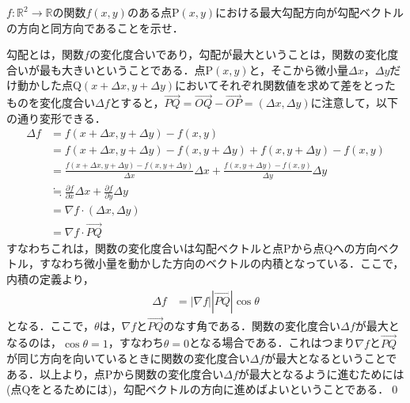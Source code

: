 \begin{qu}
$f:\mathbb{R}^2 \to \mathbb{R}$の関数$f(x,y)$のある点P$(x,y)$における最大勾配方向が勾配ベクトルの方向と同方向であることを示せ．
\end{qu}
\begin{ans}
勾配とは，関数$f$の変化度合いであり，勾配が最大ということは，関数の変化度合いが最も大きいということである．点P$(x,y)$と，そこから微小量$\Delta x$，$\Delta y$だけ動かした点Q$(x+\Delta x,y+\Delta y)$においてそれぞれ関数値を求めて差をとったものを変化度合い$\Delta f$とすると，$\overrightarrow{PQ}=\overrightarrow{OQ}-\overrightarrow{OP}=(\Delta x,\Delta y)$に注意して，以下の通り変形できる．
\begin{align*}
\Delta f &= f(x+\Delta x,y+\Delta y)-f(x,y) \\
&= f(x+\Delta x,y+\Delta y) -f(x,y+\Delta y)+f(x,y+\Delta y) -f(x,y) \\
&= \frac{f(x+\Delta x,y+\Delta y) -f(x,y+\Delta y)}{\Delta x}\Delta x +\frac{f(x,y+\Delta y) -f(x,y)}{\Delta y}\Delta y \\
&\fallingdotseq \frac{\partial f}{\partial x}\Delta x +\frac{\partial f}{\partial y}\Delta y \\
&= \nabla f \cdot (\Delta x,\Delta y) \\
&= \nabla f \cdot \overrightarrow{PQ}
\end{align*}
すなわちこれは，関数の変化度合いは勾配ベクトルと点Pから点Qへの方向ベクトル，すなわち微小量を動かした方向のベクトルの内積となっている．ここで，内積の定義より，
\begin{align*}
\Delta f &= |\nabla f||\overrightarrow{PQ}|\cos \theta
\end{align*}
となる．ここで，$\theta$は，$\nabla f$と$\overrightarrow{PQ}$のなす角である．関数の変化度合い$\Delta f$が最大となるのは，$\cos \theta =1$，すなわち$\theta =0$となる場合である．これはつまり$\nabla f$と$\overrightarrow{PQ}$が同じ方向を向いているときに関数の変化度合い$\Delta f$が最大となるということである．以上より，点Pから関数の変化度合い$\Delta f$が最大となるように進むためには(点Qをとるためには)，勾配ベクトルの方向に進めばよいということである．\qed
\end{ans}

